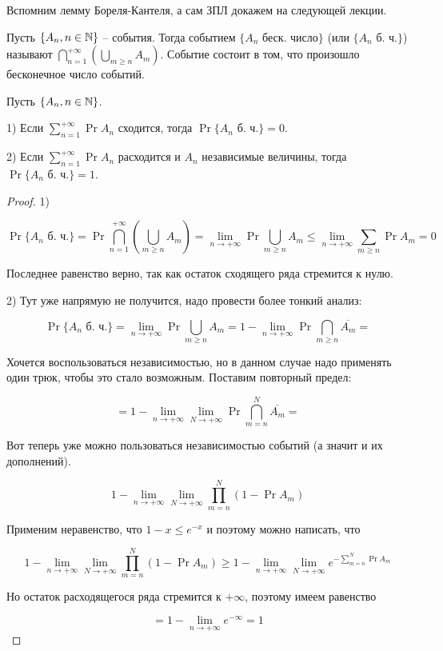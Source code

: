Вспомним лемму Бореля-Кантеля, а сам ЗПЛ докажем на следующей лекции.

\begin{definition}
  Пусть $\{A_n, n \in \mathbb{N}\}$ -- события. Тогда событием $\{A_n \text{ беск. число}\}$
  (или $\{A_n \text{ б. ч.}\}$)
  называют $\bigcap\limits_{n = 1}^{+\infty}\left(\bigcup\limits_{m \geq n} A_m\right)$. Событие
  состоит в том, что произошло бесконечное число событий.
\end{definition}

\begin{theorem}
  Пусть $\{A_n, n \in \mathbb{N}\}$. 

  1) Если $\sum\limits_{n = 1}^{+\infty} \Pr{A_n}$ сходится,
  тогда $\Pr{\{A_n \text{ б. ч.}\}} = 0$.

  2) Если $\sum\limits_{n = 1}^{+\infty} \Pr{A_n}$ расходится и $A_n$ независимые
  величины,
  тогда $\Pr{\{A_n \text{ б. ч.}\}} = 1$.
\end{theorem}

\begin{proof}
  1)

  \[
    \Pr{\{A_n \text{ б. ч.}\}} = \Pr{\bigcap\limits_{n = 1}^{+\infty}\left(\bigcup\limits_{m \geq n} A_m\right)} =
    \lim\limits_{n \to +\infty} \Pr{\bigcup\limits_{m \geq n} A_m} \leq
    \lim\limits_{n \to +\infty} \sum\limits_{m \geq n} \Pr{A_m} = 0
  \]

  Последнее равенство верно, так как остаток сходящего ряда стремится к нулю.

  2) Тут уже напрямую не получится, надо провести более тонкий анализ:

  \[
     \Pr{\{A_n \text{ б. ч.}\}} =  \lim\limits_{n \to +\infty} \Pr{\bigcup\limits_{m \geq n} A_m} = 1 - \lim\limits_{n \to +\infty} \Pr{\bigcap\limits_{m \geq n} \overline{A_m}} = 
  \]

  Хочется воспользоваться независимостью, но в данном случае надо применять один
  трюк, чтобы это стало возможным. Поставим повторный предел:

  \[
    =  1 - \lim\limits_{n \to +\infty}\lim\limits_{N \to +\infty} \Pr{\bigcap\limits_{m = n}^{N} \overline{A_m}} = 
  \]

  Вот теперь уже можно пользоваться независимостью событий (а значит и их
  дополнений).

  \[
    1 - \lim\limits_{n \to +\infty}\lim\limits_{N \to +\infty} \prod_{m = n}^{N}(1 -
    \Pr{A_m}) 
  \]

  Применим неравенство, что $1 - x \leqslant e^{-x}$ и поэтому можно написать, что

  \[
    1 - \lim\limits_{n \to +\infty}\lim\limits_{N \to +\infty} \prod_{m = n}^{N}(1 -
    \Pr{A_m}) \geq 1 - \lim\limits_{n \to +\infty}\lim\limits_{N \to +\infty}
    e^{-\sum\limits_{m = n}^{N} \Pr{A_m}}
  \]

  Но остаток расходящегося ряда стремится к $+\infty$, поэтому имеем равенство

  \[
    = 1 - \lim\limits_{n \to +\infty}e^{-\infty} = 1
  \]
\end{proof}
